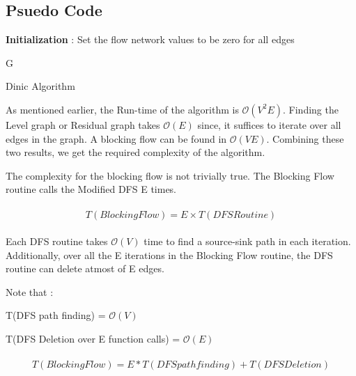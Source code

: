 \documentclass[paper=a4, fontsize=11pt]{scrartcl} %
\numberwithin{equation}{section} %
\numberwithin{figure}{section} %
\numberwithin{table}{section} %
\begin{document}
\subsection{Psuedo Code}

\begin{algorithm}[H]
\textbf{Initialization} : Set the flow network values to be zero for all edges \;

\Return G
\caption{Dinic Algorithm}
\end{algorithm}


As mentioned earlier, the Run-time of the algorithm is $\mathcal{O}(V^2E)$. Finding the Level graph or Residual graph takes $\mathcal{O}(E)$ since, it suffices to iterate over all edges in the graph. A blocking flow can be found in $\mathcal{O}(VE)$. Combining these two results, we get the required complexity of the algorithm.

The complexity for the blocking flow is not trivially true. The Blocking Flow routine calls the Modified DFS E times.

\begin{align}
\begin{split}
T(Blocking Flow) = E \times T(DFS Routine)
\end{split}
\end{align}

Each DFS routine takes $\mathcal{O}(V)$ time to find a source-sink path in each iteration. Additionally, over all the E iterations in the Blocking Flow routine, the DFS routine can delete atmost of E edges.

Note that :

T(DFS path finding) = $\mathcal{O}(V)$

T(DFS Deletion over E function calls) = $\mathcal{O}(E)$

\begin{align}
\begin{split}
T(Blocking Flow) = E * T(DFS path finding) + T(DFS Deletion )
\end{split}
\end{align}
\end{document}
